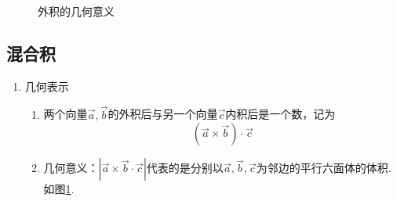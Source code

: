 \begin{enumerate}[1.]
\begin{figure}[h]
\begin{minipage}{0.4\linewidth}
			\caption{外积的几何意义}
			\label{混合积}
		\end{minipage}
	\end{figure}
\end{enumerate}
\subsection{混合积}
\begin{enumerate}[1.]
			\setlength{\itemindent}{1.5em} 
	\setlength{\topsep}{0.01em}
	\setlength{\itemsep}{0.01em}
	\item {\color{dy2}几何表示}
	\begin{enumerate}[]
				\setlength{\itemindent}{1.5em} 
		\setlength{\topsep}{0.01em}
		\setlength{\itemsep}{0.01em}
		\item 两个向量$\overrightarrow{a},\overrightarrow{b}$的外积后与另一个向量$\overrightarrow{c}$内积后是一个数，记为
		\begin{equation}
			\left( \overrightarrow{a}\times\overrightarrow{b}\right) \cdot \overrightarrow{c}
		\end{equation}
		\item {\color{dy}几何意义}\label{混合积的几何意义}：$\left|\overrightarrow{a}\times\overrightarrow{b}\cdot \overrightarrow{c} \right|$代表的是分别以$\overrightarrow{a},\overrightarrow{b},\overrightarrow{c}$为邻边的平行六面体的体积. 如图\ref{混合积}.
	\end{enumerate}


\end{enumerate}
